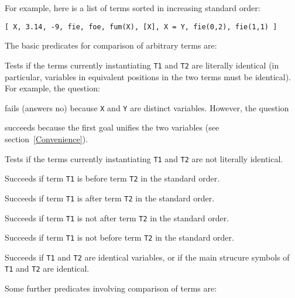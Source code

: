 For example, here is a list of terms sorted in increasing standard order:
\begin{center}
	{\tt [ X, 3.14, -9, fie, foe, fum(X), [X], X = Y, fie(0,2), fie(1,1) ]}
\end{center}
The basic predicates for comparison of arbitrary terms are:
\begin{description}
    Tests if the terms currently instantiating {\tt T1} and {\tt T2}
    are literally identical (in particular, variables in equivalent positions
    in the two terms must be identical).
    For example, the question:


    \noindent
    fails (answers no) because {\tt X} and {\tt Y} are distinct variables.
    However, the question


    \noindent
    succeeds because the first goal unifies the two variables 
    (see section~\ref{Convenience}).

    Tests if the terms currently instantiating {\tt T1} and {\tt T2}
    are not literally identical.

    Succeeds if term {\tt T1} is before term {\tt T2} in the standard order.

    Succeeds if term {\tt T1} is after term {\tt T2} in the standard order.

    Succeeds if term {\tt T1} is not after term {\tt T2} in the standard order.

    Succeeds if term {\tt T1} is not before term {\tt T2} in the standard order.

    Succeeds if {\tt T1} and {\tt T2} are identical variables, or if
    the main strucure symbols of {\tt T1} and {\tt T2} are identical.

\end{description}

Some further predicates involving comparison of terms are:

